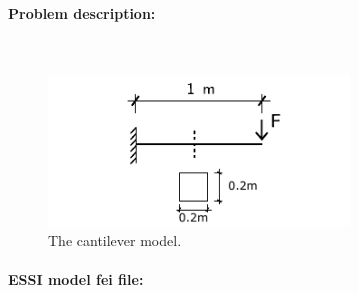 \documentclass[fleqn,11pt]{article}
\begin{document}
\paragraph{Problem description:} ~

% 
% 
% 

\begin{figure}[!htb]
  \centering
  \includegraphics[width=8cm]{../Figure-files/_Chapter_Appendix_Illustrative_Examples/cantilever.pdf}
  \caption{The cantilever model.}
\end{figure}


\paragraph{ESSI model fei file: }  ~
\end{document}
